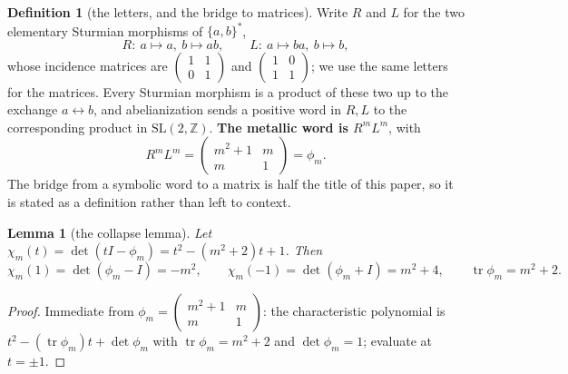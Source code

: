 \documentclass[11pt,reqno]{amsart}
\theoremstyle{plain}
\newtheorem{lemma}[theorem]{Lemma}
\theoremstyle{definition}
\newtheorem{definition}[theorem]{Definition}
\theoremstyle{remark}
\newcommand{\Z}{\mathbb{Z}}
\newcommand{\SL}{\mathrm{SL}}
\begin{document}
\begin{definition}[the letters, and the bridge to matrices]\label{def:RL}
Write $R$ and $L$ for the two elementary Sturmian morphisms of $\{a,b\}^*$,
\[
   R:\ a\mapsto a,\ b\mapsto ab,\qquad
   L:\ a\mapsto ba,\ b\mapsto b,
\]
whose incidence matrices are
$\left(\begin{smallmatrix}1&1\\0&1\end{smallmatrix}\right)$ and
$\left(\begin{smallmatrix}1&0\\1&1\end{smallmatrix}\right)$; we use the same letters for
the matrices. Every Sturmian morphism is a product of these two up to the exchange
$a\leftrightarrow b$, and abelianization sends a positive word in $R,L$ to the
corresponding product in $\SL(2,\Z)$. \textbf{The metallic word is $R^mL^m$}, with
\[
   R^mL^m=\begin{pmatrix}m^2+1&m\\m&1\end{pmatrix}=\phi_m .
\]
The bridge from a symbolic word to a matrix is half the title of this paper, so it is
stated as a definition rather than left to context.
\end{definition}

\begin{lemma}[the collapse lemma]\label{lem:collapse}
Let $\chi_m(t)=\det(tI-\phi_m)=t^2-(m^2+2)t+1$. Then
\[
   \chi_m(1)=\det(\phi_m-I)=-m^2,\qquad
   \chi_m(-1)=\det(\phi_m+I)=m^2+4,\qquad
   \operatorname{tr}\phi_m=m^2+2 .
\]
\end{lemma}

\begin{proof}
Immediate from $\phi_m=\left(\begin{smallmatrix}m^2+1&m\\m&1\end{smallmatrix}\right)$:
the characteristic polynomial is $t^2-(\operatorname{tr}\phi_m)t+\det\phi_m$ with
$\operatorname{tr}\phi_m=m^2+2$ and $\det\phi_m=1$; evaluate at $t=\pm1$.
\end{proof}
\end{document}
